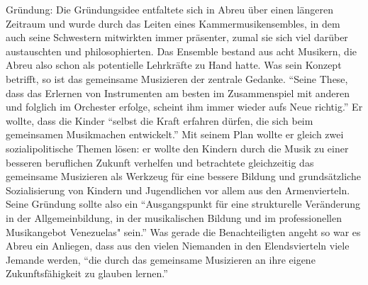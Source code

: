 Gründung: Die Gründungsidee entfaltete sich in Abreu über einen längeren
Zeitraum und wurde durch das Leiten eines Kammermusikensembles, in dem auch
seine Schwestern mitwirkten immer präsenter, zumal sie sich viel darüber
austauschten und philosophierten. Das Ensemble bestand aus acht Musikern, die
Abreu also schon als potentielle Lehrkräfte zu Hand hatte.
\autocite[34]{kaufmann:el_sistema} Was sein Konzept betrifft, so ist das
gemeinsame Musizieren der zentrale Gedanke. \enquote{Seine These, dass das Erlernen von
Instrumenten am besten im Zusammenspiel mit anderen und folglich im Orchester
erfolge, scheint ihm immer wieder aufs Neue
richtig.}\autocite[34]{kaufmann:el_sistema} Er wollte, dass die Kinder
\enquote{selbst die Kraft erfahren dürfen, die sich beim gemeinsamen Musikmachen
entwickelt.}\autocite[34]{kaufmann:el_sistema} Mit seinem Plan wollte er gleich
zwei sozialipolitische Themen lösen: er wollte den Kindern durch die Musik zu
einer besseren beruflichen Zukunft verhelfen und betrachtete gleichzeitig das
gemeinsame Musizieren als Werkzeug für eine bessere Bildung und grundsätzliche
Sozialisierung von Kindern und Jugendlichen vor allem aus den Armenvierteln. Seine Gründung
sollte also ein \enquote{Ausgangspunkt für eine strukturelle Veränderung in der
Allgemeinbildung, in der musikalischen Bildung und im professionellen
Musikangebot Venezuelas" sein.}\autocite[38]{kaufmann:el_sistema} Was gerade die
Benachteiligten angeht so war es Abreu ein Anliegen, dass aus den vielen
Niemanden in den Elendsvierteln viele Jemande werden, \enquote{die durch das gemeinsame
Musizieren an ihre eigene Zukunftsfähigkeit zu glauben
lernen.}\autocite[39]{kaufmann:el_sistema}

